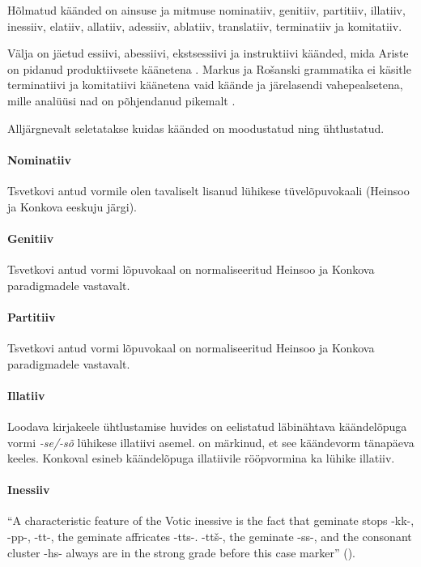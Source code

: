 \documentclass[12pt,a4paper]{article}
\begin{document}
Hõlmatud käänded on ainsuse ja mitmuse nominatiiv, genitiiv, partitiiv, illatiiv, inessiiv, elatiiv, allatiiv, adessiiv, ablatiiv, translatiiv, terminatiiv ja komitatiiv.

Välja on jäetud essiivi, abessiivi, ekstsessiivi ja instruktiivi käänded, mida Ariste on pidanud produktiivsete käänetena \cite[17]{ariste_grammar_1968}. Markus ja Rošanski grammatika \cite{__2011} ei käsitle terminatiivi ja komitatiivi käänetena vaid käände ja järelasendi vahepealsetena, mille analüüsi nad on põhjendanud pikemalt \cite{markus_comitative_2014}.

Alljärgnevalt seletatakse kuidas käänded on moodustatud ning ühtlustatud.

\paragraph*{Nominatiiv}
Tsvetkovi antud vormile olen tavaliselt lisanud lühikese tüvelõpuvokaali (Heinsoo ja Konkova eeskuju järgi).

\paragraph*{Genitiiv}
Tsvetkovi antud vormi lõpuvokaal on normaliseeritud Heinsoo ja Konkova paradigmadele vastavalt.

\paragraph*{Partitiiv}
Tsvetkovi antud vormi lõpuvokaal on normaliseeritud Heinsoo ja Konkova paradigmadele vastavalt.

\paragraph*{Illatiiv}
Loodava kirjakeele ühtlustamise huvides on eelistatud läbinähtava käändelõpuga vormi \textit{-se/-sõ} lühikese illatiivi asemel. \cite[247]{markus_comitative_2014} on märkinud, et see käändevorm tänapäeva keeles. Konkoval esineb käändelõpuga illatiivile rööpvormina ka lühike illatiiv. 

\paragraph*{Inessiiv}

``A characteristic feature of the Votic inessive is the fact that
geminate stops -kk-, -pp-, -tt-, the geminate affricates -tts-.
-ttš-, the geminate -ss-, and the consonant cluster -hs- always
are in the strong grade before this case marker'' (\cite[23]{ariste_grammar_1968}).
\end{document}
